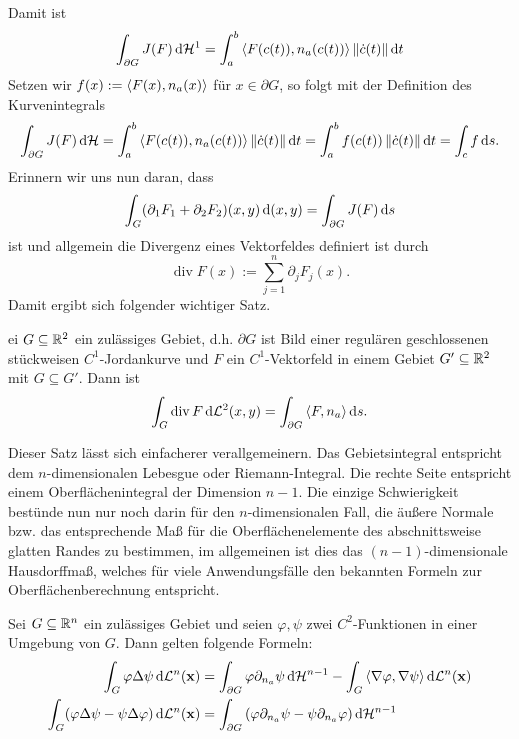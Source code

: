 \documentclass[
pdftex,
oneside,
headsepline,
11pt, 
]{scrreprt}
\begin{document}
Damit ist \[  \int_{\partial G} J(F) \mathop{}\!\mathrm{d} \mathcal{H}^1=\int_a^b \left\langle F(c(t)),n_a(c(t)) \right\rangle\left\lVert\dot{c}(t)\right\rVert\mathop{}\!\mathrm{d} t \]   
Setzen wir $f(x):=\left\langle F(x),n_a(x) \right\rangle$ für $x\in\partial G$, so folgt mit der Definition des Kurvenintegrals
\[ \int_{\partial G} J(F) \mathop{}\!\mathrm{d} \mathcal{H}= \int_a^b \left\langle F(c(t)),n_a(c(t)) \right\rangle\left\lVert\dot{c}(t)\right\rVert\mathop{}\!\mathrm{d} t =\int_a^b f(c(t))\left\lVert\dot{c}(t)\right\rVert\mathop{}\!\mathrm{d} t=\int_c f \mathop{}\!\mathrm{d} s.\] Erinnern wir uns nun daran, dass \[  \int_G (\partial_1 F_1+\partial_2F_2)(x,y)\mathop{}\!\mathrm{d} (x,y)=\int_{\partial G}J(F)\mathop{}\!\mathrm{d} s \] ist und allgemein die Divergenz eines Vektorfeldes definiert ist durch \[ \operatorname{div} F(x):=\sum_{j=1}^n \partial_jF_j(x).\] Damit ergibt sich folgender wichtiger Satz.
\begin{theo}
	ei $G\subseteq \mathbb{R}^2$ ein zulässiges Gebiet, d.h. $\partial G$ ist Bild einer regulären geschlossenen stückweisen $C^1$-Jordankurve und $F$ ein $C^1$-Vektorfeld in einem Gebiet $G'\subseteq \mathbb{R}^2$ mit $G\subseteq G'$. Dann ist \[  \int_G \operatorname{div} F \mathop{}\!\mathrm{d} \mathcal{L}^2(x,y)=\int_{\partial G} \left\langle F,n_a \right\rangle \mathop{}\!\mathrm{d} s. \]
\end{theo}
Dieser Satz lässt sich einfacherer verallgemeinern. Das Gebietsintegral entspricht dem $n$-dimensionalen Lebesgue oder  Riemann-Integral. Die rechte Seite entspricht einem Oberflächenintegral der Dimension $n-1$. Die einzige Schwierigkeit bestünde nun nur noch darin für den $n$-dimensionalen Fall, die äußere Normale bzw. das entsprechende Maß für die Oberflächenelemente des abschnittsweise glatten Randes zu bestimmen, im allgemeinen ist dies das $(n-1)$-dimensionale Hausdorffmaß, welches für viele Anwendungsfälle den bekannten Formeln zur Oberflächenberechnung entspricht. 
\begin{theo} Sei $G\subseteq \mathbb{R}^n$ ein zulässiges Gebiet und seien $\varphi,\psi$ zwei $C^2$-Funktionen in einer Umgebung von $G$. Dann gelten folgende Formeln: 
	\begin{align*}
	\int_G \varphi \Delta \psi \mathop{}\!\mathrm{d} \mathcal{L}^n(\textnormal{\textbf{x}})&=\int_{\partial G}\varphi \partial_{n_a}\psi \mathop{}\!\mathrm{d} \mathcal{H}^{n-1}-\int_G\left\langle \nabla \varphi,\nabla \psi \right\rangle\mathop{}\!\mathrm{d} \mathcal{L}^n(\textnormal{\textbf{x}})\\
	\int_G (\varphi \Delta \psi-\psi\Delta\varphi) \mathop{}\!\mathrm{d} \mathcal{L}^n(\textnormal{\textbf{x}})&=\int_{\partial G}\left(  \varphi\partial_{n_a}\psi-\psi\partial_{n_a}\varphi \right)\mathop{}\!\mathrm{d} \mathcal{H}^{n-1}
	\end{align*}
\end{theo}
\end{document}
